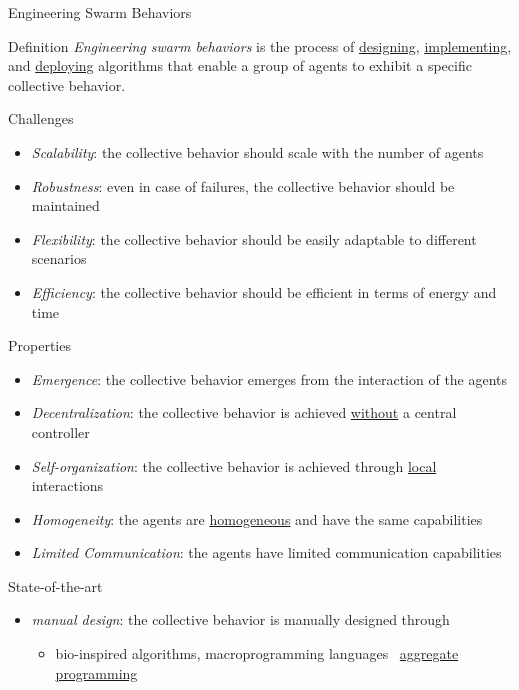 \documentclass[presentation, 9pt]{beamer}\mode<presentation>{\usetheme{AMSBolognaFC}}
\begin{document}
\begin{frame}[allowframebreaks]{Engineering Swarm Behaviors}
	\begin{alertblock}{Definition}
		\emph{Engineering swarm behaviors} is the process of \underline{designing}, \underline{implementing}, and \underline{deploying} algorithms that enable a group of agents to exhibit a specific collective behavior.
	\end{alertblock}
	\begin{exampleblock}{Challenges}
		\begin{itemize}
			\item \emph{Scalability}: the collective behavior should scale with the number of agents
			\item \emph{Robustness}: even in case of failures, the collective behavior should be maintained
			\item \emph{Flexibility}: the collective behavior should be easily adaptable to different scenarios
			\item \emph{Efficiency}: the collective behavior should be efficient in terms of energy and time
		\end{itemize}
	\end{exampleblock}
	\begin{exampleblock}{Properties}
		\begin{itemize}
			\item \emph{Emergence}: the collective behavior emerges from the interaction of the agents
			\item \emph{Decentralization}: the collective behavior is achieved \underline{without} a central controller
			\item \emph{Self-organization}: the collective behavior is achieved through \underline{local} interactions
			\item \emph{Homogeneity}: the agents are \underline{homogeneous} and have the same capabilities
			\item \emph{Limited Communication}: the agents have limited communication capabilities
		\end{itemize}
	\end{exampleblock}
	\begin{block}{State-of-the-art}
		\begin{itemize}
			\item \emph{manual design}: the collective behavior is manually designed through 
			\begin{itemize}
				\item bio-inspired algorithms, macroprogramming languages \faArrowRight \, \underline{aggregate programming}

\end{itemize}
\end{itemize}
\end{block}
\end{frame}
\end{document}
